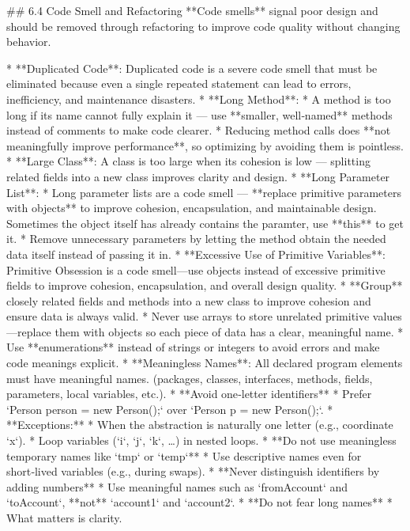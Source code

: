 \documentclass[a4paper]{scrartcl}
\begin{document}
\iffalse
## 6.4 Code Smell and Refactoring
**Code smells** signal poor design and should be removed through refactoring to improve code quality without changing behavior.

* **Duplicated Code**: Duplicated code is a severe code smell that must be eliminated because even a single repeated statement can lead to errors, inefficiency, and maintenance disasters.
* **Long Method**:
  * A method is too long if its name cannot fully explain it — use **smaller, well‑named** methods instead of comments to make code clearer.
  * Reducing method calls does **not meaningfully improve performance**, so optimizing by avoiding them is pointless.
* **Large Class**: A class is too large when its cohesion is low — splitting related fields into a new class improves clarity and design.
* **Long Parameter List**:
  * Long parameter lists are a code smell — **replace primitive parameters with objects** to improve cohesion, encapsulation, and maintainable design. Sometimes the object itself has already contains the paramter, use **this** to get it.
  * Remove unnecessary parameters by letting the method obtain the needed data itself instead of passing it in.
* **Excessive Use of Primitive Variables**: Primitive Obsession is a code smell—use objects instead of excessive primitive fields to improve cohesion, encapsulation, and overall design quality.
  * **Group** closely related fields and methods into a new class to improve cohesion and ensure data is always valid.
  * Never use arrays to store unrelated primitive values—replace them with objects so each piece of data has a clear, meaningful name.
  * Use **enumerations** instead of strings or integers to avoid errors and make code meanings explicit.
* **Meaningless Names**: All declared program elements must have meaningful names. (packages, classes, interfaces, methods, fields, parameters, local variables, etc.).
  * **Avoid one‑letter identifiers**
      *   Prefer `Person person = new Person();` over `Person p = new Person();`.
      *   **Exceptions:**
          *   When the abstraction is naturally one letter (e.g., coordinate `x`).
          *   Loop variables (`i`, `j`, `k`, …) in nested loops.
  *   **Do not use meaningless temporary names like `tmp` or `temp`**
        *   Use descriptive names even for short‑lived variables (e.g., during swaps).
  *   **Never distinguish identifiers by adding numbers**
        *   Use meaningful names such as `fromAccount` and `toAccount`, **not** `account1` and `account2`.
  *   **Do not fear long names**
        *   What matters is clarity.
\end{document}
